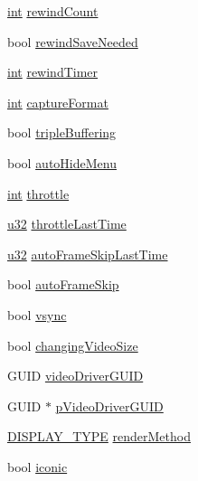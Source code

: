 \begin{DoxyCompactItemize}
\item 
\mbox{\hyperlink{_util_8cpp_a0ef32aa8672df19503a49fab2d0c8071}{int}} \mbox{\hyperlink{class_v_b_a_a39430ba84d3e7205846e24f0484d7880}{rewind\+Count}}
\item 
bool \mbox{\hyperlink{class_v_b_a_a3f8cd6f6705f0306f57818e885a50aa3}{rewind\+Save\+Needed}}
\item 
\mbox{\hyperlink{_util_8cpp_a0ef32aa8672df19503a49fab2d0c8071}{int}} \mbox{\hyperlink{class_v_b_a_a682a6a9633f41038b23a2bdcdbde844e}{rewind\+Timer}}
\item 
\mbox{\hyperlink{_util_8cpp_a0ef32aa8672df19503a49fab2d0c8071}{int}} \mbox{\hyperlink{class_v_b_a_a103f0b25433c57c4458a208a06799cf8}{capture\+Format}}
\item 
bool \mbox{\hyperlink{class_v_b_a_af597e2c2466efdc6365a5d725651b855}{triple\+Buffering}}
\item 
bool \mbox{\hyperlink{class_v_b_a_a19362d5508f73c0f93f307eef61d6915}{auto\+Hide\+Menu}}
\item 
\mbox{\hyperlink{_util_8cpp_a0ef32aa8672df19503a49fab2d0c8071}{int}} \mbox{\hyperlink{class_v_b_a_af21b98509a2589b38e4787f065b40a2b}{throttle}}
\item 
\mbox{\hyperlink{_system_8h_a10e94b422ef0c20dcdec20d31a1f5049}{u32}} \mbox{\hyperlink{class_v_b_a_ae66aa4e61c40718518c617dcc21516bf}{throttle\+Last\+Time}}
\item 
\mbox{\hyperlink{_system_8h_a10e94b422ef0c20dcdec20d31a1f5049}{u32}} \mbox{\hyperlink{class_v_b_a_ad50caab57b4ddb20bf511fe1a8c46024}{auto\+Frame\+Skip\+Last\+Time}}
\item 
bool \mbox{\hyperlink{class_v_b_a_a9ecbee7d82db73b24aee3afb66128388}{auto\+Frame\+Skip}}
\item 
bool \mbox{\hyperlink{class_v_b_a_a84075b77df64f3dc2100159064b79fba}{vsync}}
\item 
bool \mbox{\hyperlink{class_v_b_a_ace8fe4b9a73291e292f0d4879cf2c852}{changing\+Video\+Size}}
\item 
G\+U\+ID \mbox{\hyperlink{class_v_b_a_a797f633003e17035a87922e9f76f8a6d}{video\+Driver\+G\+U\+ID}}
\item 
G\+U\+ID $\ast$ \mbox{\hyperlink{class_v_b_a_a457e9b79d010d5ece39a37a2e73bde90}{p\+Video\+Driver\+G\+U\+ID}}
\item 
\mbox{\hyperlink{_display_8h_aa50f63b0688d0250e0be64d8401d09a0}{D\+I\+S\+P\+L\+A\+Y\+\_\+\+T\+Y\+PE}} \mbox{\hyperlink{class_v_b_a_ae31026d8986a7658f3aaa46fba9de663}{render\+Method}}
\item 
bool \mbox{\hyperlink{class_v_b_a_a8507ddf862a4e87df9491b5de3b121c1}{iconic}}

\end{DoxyCompactItemize}
